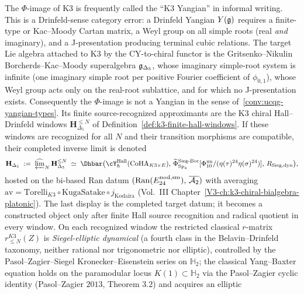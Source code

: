 \begin{remark}
\label{rem:k3-yangian-is-hall-drinfeld-double}%
%
%
The $\Phi$-image of K3 is frequently called the ``K3 Yangian'' in
informal writing. This is a Drinfeld-sense category error: a Drinfeld
Yangian $Y(\mathfrak{g})$ requires a finite-type or Kac--Moody Cartan matrix, a
Weyl group on all simple roots (real \emph{and} imaginary), and a
J-presentation producing terminal cubic relations. The target Lie algebra
attached to K3 by the CY-to-chiral functor is the Gritsenko--Nikulin
Borcherds--Kac--Moody superalgebra $\mathfrak{g}_{\Delta_5}$, whose imaginary
simple-root system is infinite (one imaginary simple root per positive
Fourier coefficient of $\phi_{0,1}$), whose Weyl group acts only on the
real-root sublattice, and for which no J-presentation exists.
Consequently the $\Phi$-image is not a Yangian in the sense
of~\cref{conv:ucqg-yangian-types}.  Its finite source-recognized
approximants are the K3 chiral Hall--Drinfeld windows
$\mathbf H_{\Delta_5}^{\le N}$ of
Definition~\ref{def:k3-finite-hall-windows}.  If these windows are
recognized for all $N$ and their transition morphisms are compatible,
their completed inverse limit is denoted
\[
 \mathbf{H}_{\Delta_5}
 \;:=\;
 \widehat{\varprojlim}_{N}\,\mathbf H_{\Delta_5}^{\le N}
 \;\simeq\;
 \Dhbar\bigl(\cY^{\mathrm{Hall}}_{\hbar}(\operatorname{CoHA}_{K3\times E}),\,
 \widetilde{\Phi}^{\mathrm{Sieg\text{-}Bor}}_{\mathrm{Sp}_4}
 [\Phi_{10}^{\mathrm{un}}/(\eta(\tau)^{24}\eta(\sigma)^{24})],\,
 R_{\mathrm{Sieg,dyn}}\bigr),
\]
hosted on the bi-based Ran datum
$(\mathrm{Ran}(E^{\mathrm{nod,sm}}_{24}),\, \overline{\mathcal{A}_2})$ with averaging
$\mathrm{av} = \mathrm{Torelli}_{K3}\circ \mathrm{KugaSatake}\circ j_{\mathrm{Kodaira}}$
(Vol.~III Chapter~\ref{V3-ch:k3-chiral-bialgebra-platonic}).  The last
display is the completed target datum; it becomes a constructed
object only after finite Hall source recognition and radical quotient
in every window.  On each recognized window the restricted classical
$r$-matrix $r^{K3}_{\le N}(Z)$ is \emph{Siegel-elliptic dynamical} (a fourth class
in the Belavin--Drinfeld taxonomy, neither rational nor trigonometric nor
elliptic), controlled by the Pasol--Zagier--Siegel Kronecker--Eisenstein
series on $\mathbb{H}_2$; the classical Yang--Baxter equation holds on the
paramodular locus $K(1)\subset \mathbb{H}_2$ via the Pasol--Zagier cyclic
identity (Pasol--Zagier $2013$, Theorem $3.2$) and acquires an elliptic

\end{remark}
